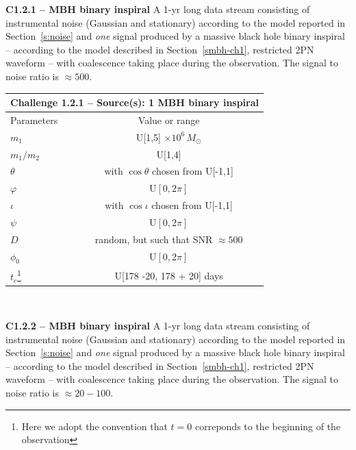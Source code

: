 \documentclass[11pt]{report}
\begin{document}
\begin{description}

\item {\bf C1.2.1 -- MBH binary inspiral} A 1-yr long data stream consisting of instrumental noise (Gaussian and stationary) according to the model reported in Section~\ref{s:noise} and {\em one} signal produced by a massive black hole binary inspiral -- according to the model described in Section~\ref{smbh-ch1}, restricted 2PN waveform -- with coalescence taking place during the observation. The signal to noise ratio is $\approx 500$. 

\begin{center}
\begin{tabular}{l|c}
\hline \hline
\multicolumn{2}{c}{{\bf Challenge 1.2.1 -- Source(s): 1 MBH binary inspiral}} \\
\hline
Parameters & Value or range \\
\hline
$m_1$             & U[1,5] $\times 10^6\,M_\odot$ \\
$m_1/m_2$         & U[1,4] \\
$\theta$          & with $\cos\theta$ chosen from U[-1,1]\\
$\varphi$         & U$[0,2\pi]$ \\ 
$\iota$           & with $\cos\iota$ chosen from U[-1,1]\\ 
$\psi$            & U$[0,2\pi]$ \\
$D$        & random, but such that SNR $\approx 500$ \\
$\phi_0$          & U$[0,2\pi]$ \\
$t_c$\footnote{Here we adopt the convention that $t = 0$ correponds to the beginning of the observation}             & U[178 -20, 178 + 20] days \\
\hline \hline
\end{tabular} \\
\end{center}

\item {\bf C1.2.2 -- MBH binary inspiral} A 1-yr long data stream consisting of instrumental noise (Gaussian and stationary) according to the model reported in Section~\ref{s:noise} and {\em one} signal produced by a massive black hole binary inspiral -- according to the model described in Section~\ref{smbh-ch1}, restricted 2PN waveform -- with coalescence taking place during the observation. The signal to noise ratio is $\approx 20-100$. 


\end{description}
\end{document}

